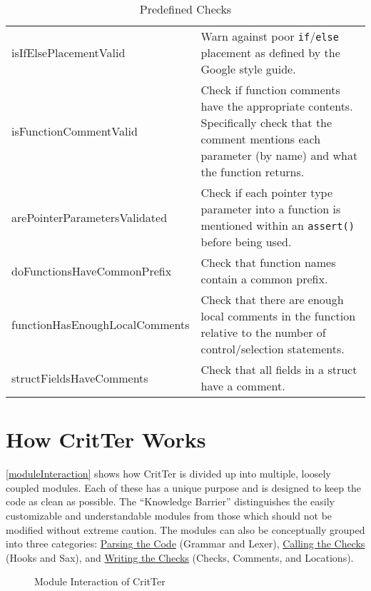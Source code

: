 \documentclass[12pt]{report}
\newcommand{\programName}{CritTer\xspace}
\begin{document}
\begin{table}
\begin{center}
\begin{tabular}{p{5.4cm} p{8.8cm}}
		isIfElsePlacementValid & Warn against poor \lstinline!if!\slash\lstinline!else! placement as defined by the Google style guide. \\
		isFunctionCommentValid & Check if function comments have the appropriate contents. Specifically check that the comment mentions each parameter (by name) and what the function returns. \\
		arePointerParametersValidated & Check if each pointer type parameter into a function is mentioned within an \lstinline!assert()! before being used. \\
		doFunctionsHaveCommonPrefix & Check that function names contain a common prefix. \\
		functionHasEnoughLocal\-Comments & Check that there are enough local comments in the function relative to the number of control/selection statements. \\
		structFieldsHaveComments & Check that all fields in a struct have a comment. \\
		\bottomrule
	\end{tabular}
	\end{center}
\caption{Predefined Checks}
\label{predefinedChecks}
\end{table}

\chapter{How \programName Works}
\label{howItWorks}

\autoref{moduleInteraction} shows how \programName is divided up into multiple, loosely coupled 
modules. Each of these has a unique purpose and is designed to keep the code as clean as possible. 
The ``Knowledge Barrier'' distinguishes the easily customizable and understandable modules from 
those which should not be modified without extreme caution. The modules can also be conceptually 
grouped into three categories: \hyperref[parsingTheCode]{Parsing the Code} (Grammar and Lexer), 
\hyperref[callingTheChecks]{Calling the Checks} (Hooks and Sax), and 
\hyperref[writingTheChecks]{Writing the Checks} (Checks, Comments, and Locations).

\begin{figure}[h!]
\begin{center}
\end{center}
\caption{Module Interaction of \programName}
\label{moduleInteraction}
\end{figure}
\end{document}
